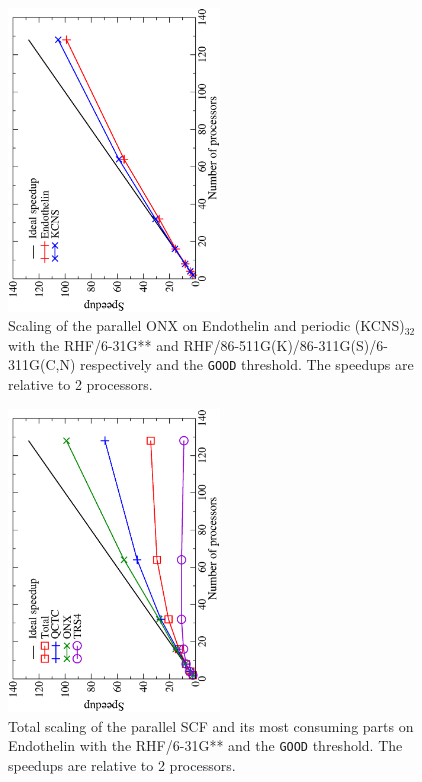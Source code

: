 \documentclass[prl,twocolumn,twocolumngrid,superbib]{revtex4} %
\begin{document}
\begin{figure}[p]
  \caption{\protect
    Scaling of the parallel ONX on Endothelin and periodic (KCNS)$_{32}$ with 
    the RHF/6-31G** and RHF/86-511G(K)/86-311G(S)/6-311G(C,N) 
    respectively and the {\tt GOOD} threshold.
    The speedups are relative to 2 processors.
  }\label{fig:Endothelin_KCNS}
  \includegraphics[angle=-90,width=0.5\textwidth]{Endothelin_KCNS}
\end{figure}

\begin{figure}[p]
  \caption{\protect
    Total scaling of the parallel SCF and its most consuming parts 
    on Endothelin with the RHF/6-31G**  
    and the {\tt GOOD} threshold. 
    The speedups are relative to 2 processors.
  }\label{fig:EndothelinTotalTiming}
  \includegraphics[angle=-90,width=0.5\textwidth]{EndothelinTotalTiming}
\end{figure}
\end{document}
